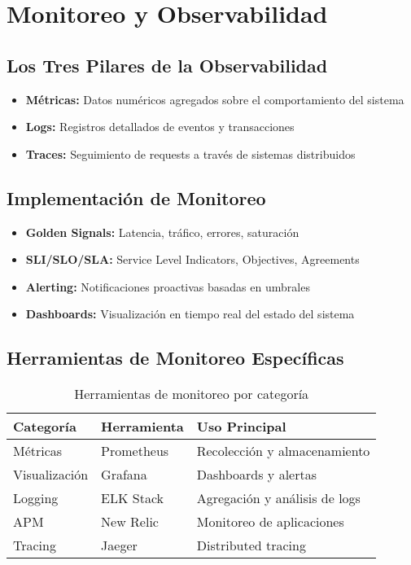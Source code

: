 \documentclass[12pt,a4paper]{article}
\begin{document}
\section{Monitoreo y Observabilidad}

\subsection{Los Tres Pilares de la Observabilidad}
\begin{itemize}
    \item \textbf{Métricas:} Datos numéricos agregados sobre el comportamiento del sistema
    \item \textbf{Logs:} Registros detallados de eventos y transacciones
    \item \textbf{Traces:} Seguimiento de requests a través de sistemas distribuidos
\end{itemize}

\subsection{Implementación de Monitoreo}
\begin{itemize}
    \item \textbf{Golden Signals:} Latencia, tráfico, errores, saturación
    \item \textbf{SLI/SLO/SLA:} Service Level Indicators, Objectives, Agreements
    \item \textbf{Alerting:} Notificaciones proactivas basadas en umbrales
    \item \textbf{Dashboards:} Visualización en tiempo real del estado del sistema
\end{itemize}

\subsection{Herramientas de Monitoreo Específicas}
\begin{table}[h!]
\centering
\begin{tabular}{|l|l|l|}
\hline
\textbf{Categoría} & \textbf{Herramienta} & \textbf{Uso Principal} \\
\hline
Métricas & Prometheus & Recolección y almacenamiento \\
\hline
Visualización & Grafana & Dashboards y alertas \\
\hline
Logging & ELK Stack & Agregación y análisis de logs \\
\hline
APM & New Relic & Monitoreo de aplicaciones \\
\hline
Tracing & Jaeger & Distributed tracing \\
\hline
\end{tabular}
\caption{Herramientas de monitoreo por categoría}
\end{table}
\end{document}
